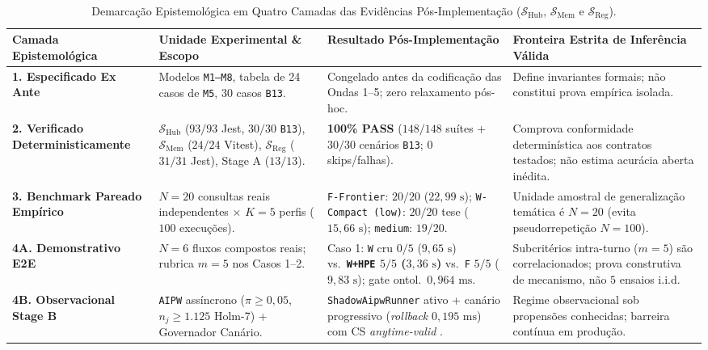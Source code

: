 \documentclass[10pt,twocolumn]{article}
\begin{document}
\begin{table}[t]
\centering
\caption{Demarca\c{c}\~ao Epistemol\'ogica em Quatro Camadas das Evid\^encias P\'os-Implementa\c{c}\~ao ($\mathcal{S}_{\mathrm{Hub}}$, $\mathcal{S}_{\mathrm{Mem}}$ e $\mathcal{S}_{\mathrm{Reg}}$).}
\label{tab:epistemic_pt}
\footnotesize
\begin{tabularx}{\textwidth}{l p{3.6cm} p{4.2cm} X}
\toprule
\textbf{Camada Epistemol\'ogica} & \textbf{Unidade Experimental \& Escopo} & \textbf{Resultado P\'os-Implementa\c{c}\~ao} & \textbf{Fronteira Estrita de Infer\^encia V\'alida} \\
\midrule
\textbf{1. Especificado Ex Ante} & Modelos \texttt{M1--M8}, tabela de 24 casos de \texttt{M5}, 30 casos \texttt{B13}. & Congelado antes da codifica\c{c}\~ao das Ondas 1--5; zero relaxamento p\'os-hoc. & Define invariantes formais; n\~ao constitui prova emp\'irica isolada. \\
\addlinespace[2pt]
\textbf{2. Verificado Deterministicamente} & $\mathcal{S}_{\mathrm{Hub}}$ ($93/93$ Jest, $30/30$ \texttt{B13}), $\mathcal{S}_{\mathrm{Mem}}$ ($24/24$ Vitest), $\mathcal{S}_{\mathrm{Reg}}$ ($31/31$ Jest), Stage A ($13/13$). & \textbf{100\% PASS} ($148/148$ su\'ites + $30/30$ cen\'arios \texttt{B13}; $0$ skips/falhas). & Comprova conformidade determin\'istica aos contratos testados; n\~ao estima acur\'acia aberta in\'edita. \\
\addlinespace[2pt]
\textbf{3. Benchmark Pareado Emp\'irico} & $N=20$ consultas reais independentes $\times$ $K=5$ perfis ($100$ execu\c{c}\~oes). & \texttt{F-Frontier}: $20/20$ ($22,99\text{ s}$); \texttt{W-Compact (low)}: $20/20$ tese ($15,66\text{ s}$); \texttt{medium}: $19/20$. & Unidade amostral de generaliza\c{c}\~ao tem\'atica \'e $N=20$ (evita pseudorrepeti\c{c}\~ao $N=100$). \\
\addlinespace[2pt]
\textbf{4A. Demonstrativo E2E} & $N=6$ fluxos compostos reais; rubrica $m=5$ nos Casos 1--2. & Caso 1: \texttt{W} cru $0/5$ ($9,65\text{ s}$) vs.\ \textbf{\texttt{W+HPE} $5/5$ ($3,36\text{ s}$)} vs.\ \texttt{F} $5/5$ ($9,83\text{ s}$); gate ontol.\ $0,964\text{ ms}$. & Subcrit\'erios intra-turno ($m=5$) s\~ao correlacionados; prova construtiva de mecanismo, n\~ao $5$ ensaios i.i.d. \\
\addlinespace[2pt]
\textbf{4B. Observacional Stage B} & \texttt{AIPW} ass\'incrono ($\pi \ge 0,05$, $n_j \ge 1.125$ Holm-7) + Governador Can\'ario. & \texttt{ShadowAipwRunner} ativo + can\'ario progressivo (\emph{rollback} $0,195\text{ ms}$) com CS \emph{anytime-valid} \cite{howard2021time}. & Regime observacional sob propens\~oes conhecidas; barreira cont\'inua em produ\c{c}\~ao. \\
\bottomrule
\end{tabularx}
\end{table}
\end{document}
